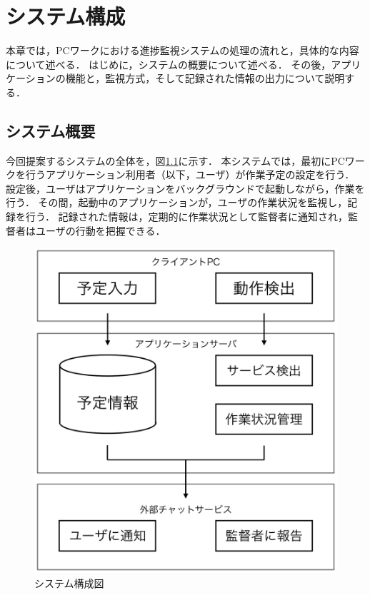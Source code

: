 \chapter{システム構成}

本章では，PCワークにおける進捗監視システムの処理の流れと，具体的な内容について述べる．
はじめに，システムの概要について述べる．
その後，アプリケーションの機能と，監視方式，そして記録された情報の出力について説明する．

\section{システム概要}
今回提案するシステムの全体を，図\ref{fig:structure_chart}に示す．
本システムでは，最初にPCワークを行うアプリケーション利用者（以下，ユーザ）が作業予定の設定を行う．
設定後，ユーザはアプリケーションをバックグラウンドで起動しながら，作業を行う．
その間，起動中のアプリケーションが，ユーザの作業状況を監視し，記録を行う．
記録された情報は，定期的に作業状況として監督者に通知され，監督者はユーザの行動を把握できる．

\clearpage

\begin{figure}[h]
  \begin{center}
  \includegraphics[width=12.0cm]{graphics/structure_chart.png}
  \caption{システム構成図}
  \label{fig:structure_chart}
  \end{center}
\end{figure}

